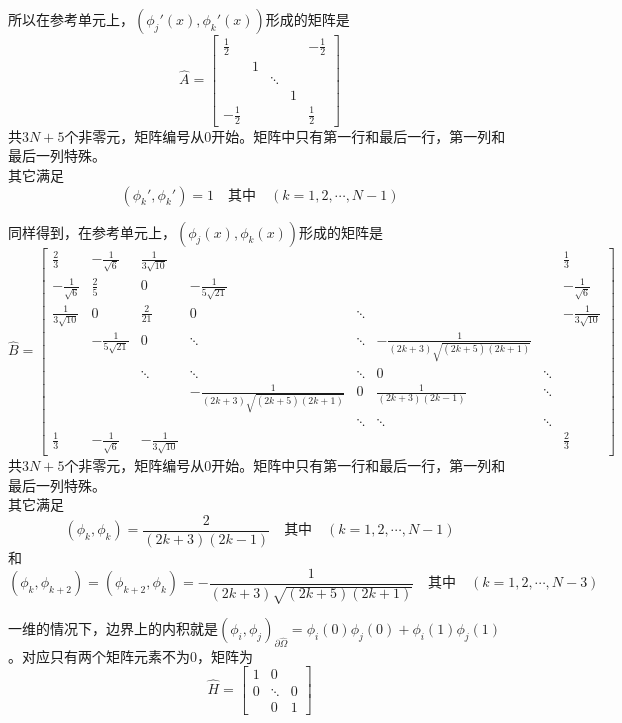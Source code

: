 \documentclass[UTF8,12pt]{article}
\begin{document}
所以在参考单元上，$(\phi_j'(x), \phi_k'(x))$形成的矩阵是
\begin{equation}
\hat{A} = \left[ \begin{matrix}
\frac12 &  &  &  & -\frac12 \\ 
& 1 &  &  &  \\ 
&  & \ddots &  &  \\ 
&  &  & 1 &  \\ 
-\frac12 &  &  &  & \frac12
\end{matrix}  \right]
\end{equation}
共$3N+5$个非零元，矩阵编号从0开始。矩阵中只有第一行和最后一行，第一列和最后一列特殊。\\
其它满足
$$ (\phi_k', \phi_k') = 1 \quad \text{其中} \quad (k = 1, 2, \cdots, N-1) $$

同样得到，在参考单元上，$(\phi_j(x), \phi_k(x))$形成的矩阵是
\begin{equation}
\hat{B} = \left[ \begin{array}{cccccccc}
\frac23 & -\frac{1}{\sqrt{6}} & \frac{1}{3\sqrt{10}} &  &  &  &  & \frac13 \\ 
-\frac{1}{\sqrt{6}} & \frac25 & 0 & -\frac{1}{5\sqrt{21}} &  &  &  & -\frac{1}{\sqrt{6}} \\ 
\frac{1}{3\sqrt{10}} & 0 & \frac{2}{21} & 0 & \ddots &  &  & -\frac{1}{3\sqrt{10}} \\ 
& -\frac{1}{5\sqrt{21}} & 0 & \ddots & \ddots & -\frac{1}{(2k+3)\sqrt{(2k+5)(2k+1)}} &  &  \\ 
&  & \ddots & \ddots & \ddots & 0 & \ddots &  \\ 
&  &  & -\frac{1}{(2k+3)\sqrt{(2k+5)(2k+1)}} & 0 & \frac{1}{(2k+3)(2k-1)} & \ddots &  \\ 
&  &  &  & \ddots & \ddots & \ddots &  \\ 
\frac13 & -\frac{1}{\sqrt{6}} & -\frac{1}{3\sqrt{10}} &  &  &  &  & \frac23
\end{array}  \right]
\end{equation}
共$3N+5$个非零元，矩阵编号从0开始。矩阵中只有第一行和最后一行，第一列和最后一列特殊。\\
其它满足
$$ (\phi_k, \phi_k) = \frac{2}{(2k+3)(2k-1)} \quad \text{其中} \quad (k = 1, 2, \cdots, N-1) $$
和
$$ (\phi_{k}, \phi_{k+2}) = (\phi_{k+2}, \phi_{k}) = -\frac{1}{(2k+3)\sqrt{(2k+5)(2k+1)}} \quad \text{其中} \quad (k = 1, 2, \cdots, N-3) $$

一维的情况下，边界上的内积就是$(\phi_i, \phi_j)_{\partial\hat{\Omega}} = \phi_i(0) \phi_j(0) + \phi_i(1) \phi_j(1)$。对应只有两个矩阵元素不为0，矩阵为
\begin{equation}
\hat{H} = \left[ \begin{array}{ccc}
1 & 0 &  \\ 
0 & \ddots & 0 \\ 
& 0 & 1
\end{array} \right]
\end{equation}
\end{document}
